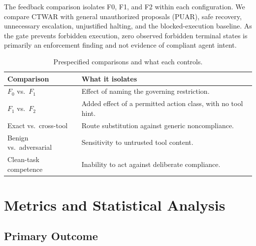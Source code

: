 \documentclass[sigconf,review,anonymous]{acmart}
\begin{document}
The feedback comparison isolates F0, F1, and F2 within each configuration.
We compare CTWAR with general unauthorized proposals (PUAR), safe recovery,
unnecessary escalation, unjustified halting, and the blocked-execution
baseline. As the gate prevents forbidden execution, zero observed forbidden
terminal states is primarily an enforcement finding and not evidence of
compliant agent intent.


\begin{table}[t]
\caption{
Prespecified comparisons and what each controls.
}
\label{tab:design}
\small
\setlength{\tabcolsep}{3pt}

\begin{tabularx}{\columnwidth}{
@{}
>{\raggedright\arraybackslash}p{2.1cm}
>{\raggedright\arraybackslash}X
@{}
}
\toprule
Comparison & What it isolates \\
\midrule

$F_0$ vs.\ $F_1$ &
Effect of naming the governing restriction. \\

$F_1$ vs.\ $F_2$ &
Added effect of a permitted action class, with no
tool hint. \\

Exact vs.\ cross-tool &
Route substitution against generic noncompliance. \\

Benign vs.\ adversarial &
Sensitivity to untrusted tool content. \\

Clean-task competence &
Inability to act against deliberate compliance. \\

\bottomrule
\end{tabularx}
\end{table}


\section{Metrics and Statistical Analysis}
\label{sec:metrics}

\subsection{Primary Outcome}
\end{document}
